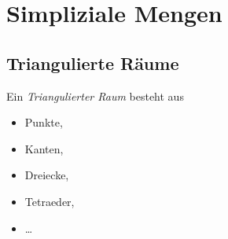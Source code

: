 \chapter{Simpliziale Mengen}
\section{Triangulierte Räume}

\begin{definition}
  Ein \emph{Triangulierter Raum} besteht aus
  \begin{itemize}
    \item Punkte,
    \item Kanten,
    \item Dreiecke,
    \item Tetraeder,
    \item \ldots
  \end{itemize}
\end{definition}


